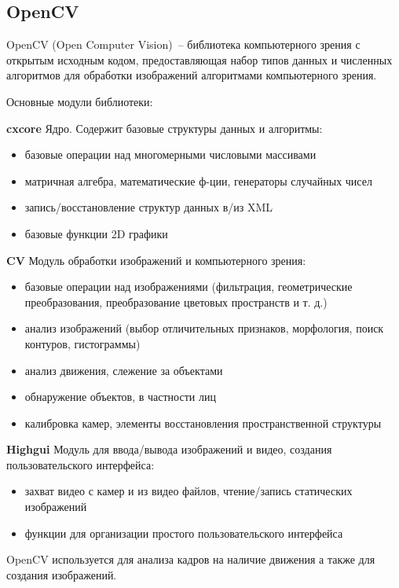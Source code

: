 \subsection{OpenCV}
OpenCV (Open Computer Vision)~-- библиотека компьютерного зрения с открытым исходным кодом,
предоставляющая набор типов данных и численных алгоритмов для обработки изображений алгоритмами
компьютерного зрения.

\medskip
Основные модули библиотеки:
\smallskip

\textbf{cxcore}
\smallskip
Ядро. Содержит базовые структуры данных и алгоритмы:
\smallskip
\begin{itemize}
	\item базовые операции над многомерными числовыми массивами
	\item матричная алгебра, математические ф-ции, генераторы случайных чисел
	\item запись/восстановление структур данных в/из XML
	\item базовые функции 2D графики
\end{itemize}

\medskip
\textbf{CV}
\smallskip
Модуль обработки изображений и компьютерного зрения:
\smallskip
\begin{itemize}
	\item
	базовые операции над изображениями (фильтрация, геометрические преобразования,
	преобразование цветовых пространств и т. д.)
	\item
	анализ изображений (выбор отличительных признаков, морфология, поиск контуров, гистограммы)
	\item
	анализ движения, слежение за объектами
	\item
	обнаружение объектов, в частности лиц
	\item
	калибровка камер, элементы восстановления пространственной структуры
\end{itemize}

\medskip
\textbf{Highgui}
Модуль для ввода/вывода изображений и видео, создания пользовательского интерфейса:
\smallskip
\begin{itemize}
	\item захват видео с камер и из видео файлов, чтение/запись статических изображений
	\item функции для организации простого пользовательского интерфейса
\end{itemize}

\medskip
OpenCV используется для анализа кадров на наличие движения а также для создания изображений.

